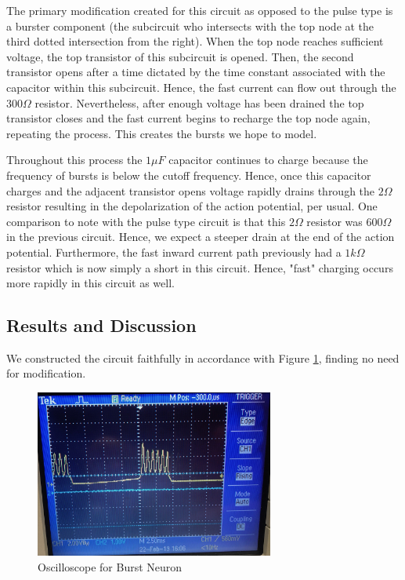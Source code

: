 \documentclass[12]{book}
\newcommand\0{\mathbf{0}}
\newcommand\<{\langle}
\renewcommand\>{\rangle}
\begin{document}
The primary modification created for this circuit as opposed to the pulse type is a burster component (the subcircuit who intersects with the top node at the third dotted intersection from the right). When the top node reaches sufficient voltage, the top transistor of this subcircuit is opened. Then, the second transistor opens after a time dictated by the time constant associated with the capacitor within this subcircuit. Hence, the fast current can flow out through the $300 \Omega$ resistor. Nevertheless, after enough voltage has been drained the top transistor closes and the fast current begins to recharge the top node again, repeating the process. This creates the bursts we hope to model.

Throughout this process the $1 \mu F$ capacitor continues to charge because the frequency of bursts is below the cutoff frequency. Hence, once this capacitor charges and the adjacent transistor opens voltage rapidly drains through the $2 \Omega$ resistor resulting in the depolarization of the action potential, per usual. One comparison to note with the pulse type circuit is that this $2 \Omega$ resistor was $600 \Omega$ in the previous circuit. Hence, we expect a steeper drain at the end of the action potential. Furthermore, the fast inward current path previously had a $1k \Omega$ resistor which is now simply a short in this circuit. Hence, "fast" charging occurs more rapidly in this circuit as well.

\subsection{Results and Discussion}

We constructed the circuit faithfully in accordance with Figure \ref{fig:maeda-burst}, finding no need for modification.

\begin{figure}[h]
\label{fig:maeda-burst}
\centering
\includegraphics[width=0.7\textwidth]{burster_osc}
\caption{Oscilloscope for Burst Neuron}
\end{figure}
\end{document}
